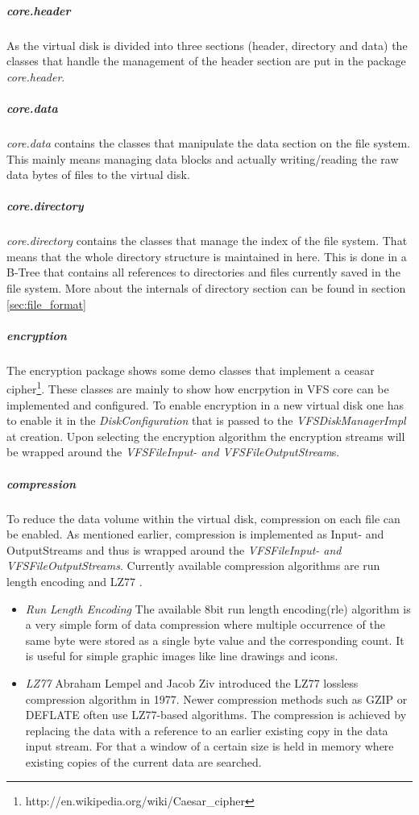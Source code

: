 \subparagraph{core.header}
As the virtual disk is divided into three sections (header, directory and data)
the classes that handle the management of the header section are put in the
package \textit{core.header}.
\subparagraph{core.data}
\textit{core.data} contains the classes that manipulate the data section on the
file system. This mainly means managing data blocks and actually writing/reading
the raw data bytes of files to the virtual disk.
\subparagraph{core.directory}
\textit{core.directory} contains the classes that manage the index of the file
system. That means that the whole directory structure is maintained in here.
This is done in a B-Tree that contains all references to directories and files
currently saved in the file system. More about the internals of directory
section can be found in section \ref{sec:file_format}

\subparagraph{encryption}
The encryption package shows some demo classes that implement a ceasar
cipher\footnote{http://en.wikipedia.org/wiki/Caesar\_cipher}. These classes are
mainly to show how encrpytion in VFS core can be implemented and configured. To
enable encryption in a new virtual disk one has to enable it in the
\textit{DiskConfiguration} that is passed to the \textit{VFSDiskManagerImpl} at
creation. Upon selecting the encryption algorithm the encryption streams will be
wrapped around the \textit{VFSFileInput- and VFSFileOutputStream}s.

\subparagraph{compression}

To reduce the data volume within the virtual disk, compression on each file can
be enabled. As mentioned earlier, compression is implemented as Input- and
OutputStreams and thus is wrapped around the \textit{VFSFileInput- and
VFSFileOutputStreams}. Currently available compression algorithms are run length
encoding \cite{rle} and LZ77 \cite{lz77}\cite{lz772}.

\begin{itemize}
  \item {\textit{Run Length Encoding}} The available 8bit run length
  encoding(rle) algorithm is a very simple form of data compression where
  multiple occurrence of the same byte were stored as a single byte value and
  the corresponding count. It is useful for simple graphic images like line
  drawings and icons.
  \item {\textit{LZ77}} Abraham Lempel and Jacob Ziv introduced the LZ77 lossless
  compression algorithm in 1977. Newer compression methods such as GZIP or DEFLATE often use LZ77-based
  algorithms. The compression is achieved by replacing the data with a reference
  to an earlier existing copy in the data input stream. For that a window of
  a certain size is held in memory where existing copies of the current data are
  searched.
\end{itemize}


